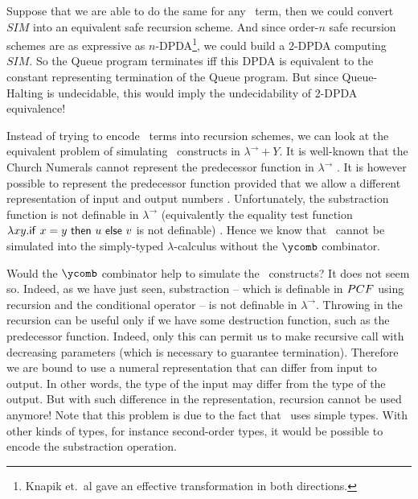 \documentclass{article}
\begin{document}
Suppose that we are able to do the same for any \pcf\ term, then we
could convert $SIM$ into an equivalent safe recursion scheme. And
since order-$n$ safe recursion schemes are as expressive as
$n$-DPDA\footnote{Knapik et.~al \cite{KNU02} gave an effective
transformation in both directions.}, we could build a
2-DPDA computing $SIM$. So the Queue program terminates iff
this DPDA is equivalent to the constant representing termination of the Queue program. But since Queue-Halting is undecidable, this would
imply the undecidability of 2-DPDA equivalence!



Instead of trying to encode  \pcf\ terms into recursion schemes, we
can look at the equivalent problem of simulating \pcf\ constructs in
$\lambda^\rightarrow + Y$. It is well-known that the Church Numerals
cannot represent the predecessor function in $\lambda^\rightarrow$ \cite{DBLP:journals/jacm/FortuneLO83}. It
is however possible to represent the predecessor function provided
that we allow a different representation of input and output numbers
\cite{DBLP:journals/jacm/FortuneLO83}. Unfortunately, the
substraction function is not definable in $\lambda^\rightarrow$
(equivalently  the equality test function $\lambda xy. {\sf if\ } x
= y {\sf\ then\ } u {\sf\ else\ } v$ is not definable)
\cite{DBLP:journals/jacm/FortuneLO83}. Hence we know that \pcf\
cannot be simulated into the simply-typed $\lambda$-calculus without
the $\ycomb$ combinator.

Would the $\ycomb$ combinator help to simulate the \pcf\ constructs? It
does not seem so. Indeed, as we have just seen, substraction --
which is definable in ${PCF}$ using recursion and the conditional
operator -- is not definable in $\lambda^\rightarrow$. Throwing in
the recursion can be useful only if we have some destruction
function, such as the predecessor function. Indeed, only this can
permit us to make recursive call with decreasing parameters (which
is necessary to guarantee termination). Therefore we are bound to
use a numeral representation that can differ from input to output.
In other words, the type of the input may differ from the type of
the output. But with such difference in the representation,
recursion cannot be used anymore! Note that this problem is due to
the fact that \pcf\ uses simple types. With other kinds of types,
for instance second-order types, it would be possible to encode the
substraction operation.
\end{document}
